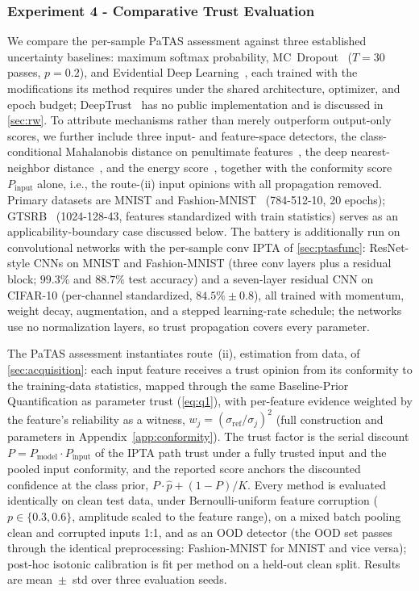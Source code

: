 \subsubsection{Experiment 4 - Comparative Trust Evaluation}\label{exp:4}
We compare the per-sample PaTAS assessment against three established uncertainty baselines: maximum softmax probability, MC~Dropout~\cite{gal2016dropoutbayesianapproximationrepresenting} ($T{=}30$ passes, $p{=}0.2$), and Evidential Deep Learning~\cite{sensoy2018evidentialdeeplearningquantify}, each trained with the modifications its method requires under the shared architecture, optimizer, and epoch budget; DeepTrust~\cite{10.3389/frai.2020.00054} has no public implementation and is discussed in \cref{sec:rw}. To attribute mechanisms rather than merely outperform output-only scores, we further include three input- and feature-space detectors, the class-conditional Mahalanobis distance on penultimate features~\cite{lee2018mahalanobis}, the deep nearest-neighbor distance~\cite{sun2022knnood}, and the energy score~\cite{liu2020energy}, together with the conformity score $P_{\mathrm{input}}$ alone, i.e., the route-(ii) input opinions with all propagation removed. Primary datasets are MNIST and Fashion-MNIST~\cite{xiao2017fashionmnist} (784-512-10, 20 epochs); GTSRB~\cite{GTSRB} (1024-128-43, features standardized with train statistics) serves as an applicability-boundary case discussed below. The battery is additionally run on convolutional networks with the per-sample conv IPTA of \cref{sec:ptasfunc}: ResNet-style CNNs on MNIST and Fashion-MNIST (three conv layers plus a residual block; $99.3\%$ and $88.7\%$ test accuracy) and a seven-layer residual CNN on CIFAR-10 (per-channel standardized, $84.5\% \pm 0.8$), all trained with momentum, weight decay, augmentation, and a stepped learning-rate schedule; the networks use no normalization layers, so trust propagation covers every parameter.

The PaTAS assessment instantiates route~(ii), estimation from data, of \cref{sec:acquisition}: each input feature receives a trust opinion from its conformity to the training-data statistics, mapped through the same Baseline-Prior Quantification as parameter trust (\cref{eq:q1}), with per-feature evidence weighted by the feature's reliability as a witness, $w_j = (\sigma_{\mathrm{ref}}/\sigma_j)^2$ (full construction and parameters in Appendix~\ref{app:conformity}). The trust factor is the serial discount $P = P_{\mathrm{model}} \cdot P_{\mathrm{input}}$ of the IPTA path trust under a fully trusted input and the pooled input conformity, and the reported score anchors the discounted confidence at the class prior, $P \cdot \hat{p} + (1-P)/K$. Every method is evaluated identically on clean test data, under Bernoulli-uniform feature corruption ($p \in \{0.3, 0.6\}$, amplitude scaled to the feature range), on a mixed batch pooling clean and corrupted inputs 1:1, and as an OOD detector (the OOD set passes through the identical preprocessing: Fashion-MNIST for MNIST and vice versa); post-hoc isotonic calibration is fit per method on a held-out clean split. Results are mean~$\pm$~std over three evaluation seeds.


